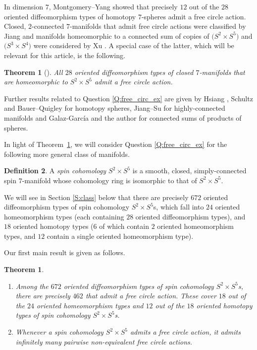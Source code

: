 \documentclass[pdftex]{sigma}
\numberwithin{equation}{section}
\newtheorem{Theorem}{Theorem}[section]
\newtheorem{theoremAlph}{Theorem}
\theoremstyle{definition}
\newtheorem{Definition}[Theorem]{Definition}
\numberwithin{table}{section}
\begin{document}
In dimension $7$, Montgomery--Yang \cite{MY68} showed that precisely $12$ out of the $28$ oriented diffeomorphism types of homotopy $7$-spheres admit a free circle action. Closed, $2$-connected $7$-manifolds that admit free circle actions were classified by Jiang \cite{Ji14} and manifolds homeomorphic to a connected sum of copies of $\bigl(S^2\times S^5\bigr)$ and $\bigl(S^3\times S^4\bigr)$ were considered by Xu \cite{Xu25}. A special case of the latter, which will be relevant for this article, is the following.
\begin{Theorem}[{\cite[Proposition 1]{Xu25}}]\label{T:S2xS5_hom}
	All $28$ oriented diffeomorphism types of closed $7$-manifolds that are homeomorphic to $S^2\times S^5$ admit a free circle action.
\end{Theorem}

Further results related to Question \ref{Q:free_circ_ex} are given by Hsiang \cite{Hs66}, Schultz \cite{Sc71} and Bauer--Quigley \cite{BQ26} for homotopy spheres, Jiang--Su \cite{JS25} for highly-connected manifolds and Galaz-García and the author \cite{GR25} for connected sums of products of spheres.

In light of Theorem~\ref{T:S2xS5_hom}, we will consider Question \ref{Q:free_circ_ex} for the following more general class of manifolds.	
\begin{Definition}
	A \emph{spin cohomology $S^2\times S^5$} is a smooth, closed, simply-connected spin $7$-mani\-fold whose cohomology ring is isomorphic to that of $S^2\times S^5$.
\end{Definition}

We will see in Section \ref{S:class} below that there are precisely $672$ oriented diffeomorphism types of spin cohomology $S^2\times S^5$s, which fall into $24$ oriented homeomorphism types (each containing $28$ oriented diffeomorphism types), and $18$ oriented homotopy types ($6$ of which contain $2$ oriented homeomorphism types, and $12$ contain a single oriented homeomorphism type).

Our first main result is given as follows.
\begin{theoremAlph}\label{T:free_circle}\qquad
	\begin{enumerate}\itemsep=0pt
		\item[$(1)$] Among the $672$ oriented diffeomorphism types of spin cohomology $S^2\times S^5$s, there are precisely $462$ that admit a free circle action. These cover $18$ out of the $24$ oriented homeomorphism types and $12$ out of the $18$ oriented homotopy types of spin cohomology $S^2\times S^5$s.
		\item[$(2)$] Whenever a spin cohomology $S^2\times S^5$ admits a free circle action, it admits infinitely many pairwise non-equivalent free circle actions.
	\end{enumerate}
\end{theoremAlph}
\end{document}
